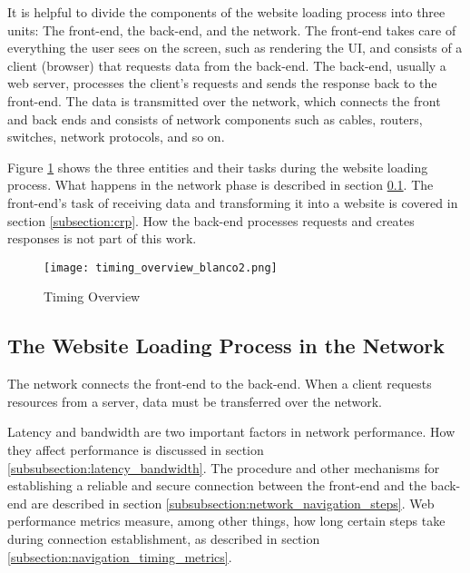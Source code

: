 
It is helpful to divide the components of the website loading process into three units: The front-end, the back-end, and the network. %
The front-end takes care of everything the user sees on the screen, such as rendering the UI, and consists of a client (browser) that requests data from the back-end.
The back-end, usually a web server, processes the client's requests and sends the response back to the front-end.
The data is transmitted over the network, which connects the front and back ends and consists of network components such as cables, routers, switches, network protocols, and so on.

Figure \ref{figure:timing_overview} shows the three entities and their tasks during the website loading process.
What happens in the network phase is described in section \ref{subsection:network_process}.
The front-end's task of receiving data and transforming it into a website is covered in section \ref{subsection:crp}.
How the back-end processes requests and creates responses is not part of this work.

\begin{figure}[h!]
\begin{center}
\texttt{[image: timing\_overview\_blanco2.png]}
\caption{Timing Overview}
\label{figure:timing_overview}
\end{center}
\end{figure}





\subsection{The Website Loading Process in the Network} %
\label{subsection:network_process}

The network connects the front-end to the back-end.
When a client requests resources from a server, data must be transferred over the network.

Latency and bandwidth are two important factors in network performance.
How they affect performance is discussed in section \ref{subsubsection:latency_bandwidth}.
The procedure and other mechanisms for establishing a reliable and secure connection between the front-end and the back-end are described in section \ref{subsubsection:network_navigation_steps}.
Web performance metrics measure, among other things, how long certain steps take during connection establishment, as described in section \ref{subsection:navigation_timing_metrics}.


